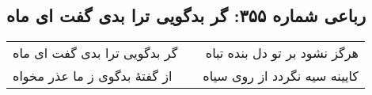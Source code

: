 \begin{center}
\section*{رباعی شماره ۳۵۵: گر بدگویی ترا بدی گفت ای ماه}
\label{sec:sh355}
\begin{longtable}{l p{0.5cm} r}
گر بدگویی ترا بدی گفت ای ماه
&&
هرگز نشود بر تو دل بنده تباه
\\
از گفتهٔ بدگوی ز ما عذر مخواه
&&
کایینه سیه نگردد از روی سیاه
\\
\end{longtable}
\end{center}

